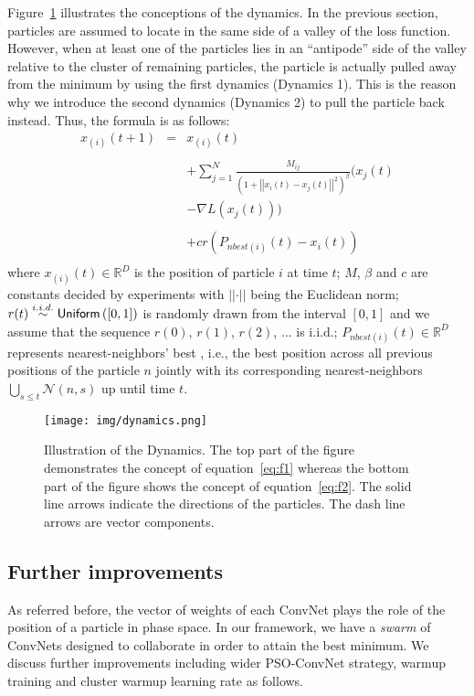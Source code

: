 \documentclass{ieeeaccess}
\begin{document}
Figure~\ref{fig:dynamics} illustrates the conceptions of the dynamics. In the previous section, particles are assumed to locate in the same side of a valley of the loss function. However, when at least one of the particles lies in an ``antipode'' side of the valley relative to the cluster of remaining particles, the particle is actually pulled away from the minimum by using the first dynamics (Dynamics 1). This is the reason why we introduce the second dynamics (Dynamics 2) to pull the particle back instead. Thus, the formula is as follows:
\begin{equation}
\begin{array}{ccl}
x_{(i)}(t+1) & = & x_{(i)}(t)\\
& & \\
& & + \sum_{j=1}^N \frac{M_{ij}}{(1+\left|\left|x_i(t)-x_j(t)\right|\right|^2)^\beta} (x_j(t)\\
& & - \nabla L(x_j(t)))\\
& & \\
& & + c r\left(P_{nbest(i)}(t)-x_{i}(t)\right) \\
\end{array} 
\label{eq:f2}
\end{equation}
where $x_{(i)}(t)\in\mathbb{R}^{D}$ is the position of particle $i$ at time $t$; $M$, $\beta$ and $c$ are constants decided by experiments with $\left|\left|\cdot\right|\right|$ being the Euclidean norm; $r(t)\overset{i.i.d.}\sim {\sf Uniform}\left(\left[0,1\right]\right)$ is randomly drawn from the interval $\left[0,1\right]$ and we assume that the sequence $r(0)$, $r(1)$, $r(2)$, $\ldots$ is i.i.d.; $P_{nbest(i)}(t)\in\mathbb{R}^D$ represents nearest-neighbors' best , i.e., the best position across all previous positions of the particle $n$ jointly with its corresponding nearest-neighbors~$\bigcup_{s\leq t} \mathcal{N}\left(n,s\right)$ up until time $t$.
\begin{figure} [hbt]
\begin{center}
\texttt{[image: img/dynamics.png]}
\caption{Illustration of the Dynamics. The top part of the figure demonstrates the concept of equation~\eqref{eq:f1} whereas the bottom part of the figure shows the concept of equation~\eqref{eq:f2}. The solid line arrows indicate the directions of the particles. The dash line arrows are  vector components.
}\label{fig:dynamics}
\end{center}
\end{figure}
\subsection{Further improvements}
As referred before, the vector of weights of each ConvNet plays the role of the position of a particle in phase space. In our framework, we have a \emph{swarm} of ConvNets designed to collaborate in order to attain the best minimum. We discuss further improvements including wider PSO-ConvNet strategy, warmup training and cluster warmup learning rate as follows.
\end{document}
